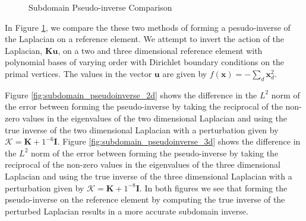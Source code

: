 \begin{figure}[!ht]
  \centering
  \hfill
  \caption{Subdomain Pseudo-inverse Comparison}
  \label{fig:subdomain_pseudoinverse}
\end{figure}

In Figure \ref{fig:subdomain_pseudoinverse}, we compare the these two methods of forming a pesudo-inverse of the Laplacian on a reference element.
We attempt to invert the action of the Laplacian, $\mathbf{K} \mathbf{u}$, on a two and three dimensional reference element with polynomial bases of varying order with Dirichlet boundary conditions on the primal vertices.
The values in the vector $\mathbf{u}$ are given by $f \left( \mathbf{x} \right) = - \sum_d \mathbf{x}_d^2$.

Figure \ref{fig:subdomain_pseudoinverse_2d} shows the difference in the $L^2$ norm of the error between forming the pseudo-inverse by taking the reciprocal of the non-zero values in the eigenvalues of the two dimensional Laplacian and using the true inverse of the two dimensional Laplacian with a perturbation given by $\boldsymbol{\mathcal{K}} = \mathbf{K} + 1^{-6} \mathbf{I}$.
Figure \ref{fig:subdomain_pseudoinverse_3d} shows the difference in the $L^2$ norm of the error between forming the pseudo-inverse by taking the reciprocal of the non-zero values in the eigenvalues of the three dimensional Laplacian and using the true inverse of the three dimensional Laplacian with a perturbation given by $\boldsymbol{\mathcal{K}} = \mathbf{K} + 1^{-8} \mathbf{I}$.
In both figures we see that forming the pseudo-inverse on the reference element by computing the true inverse of the perturbed Laplacian results in a more accurate subdomain inverse.

